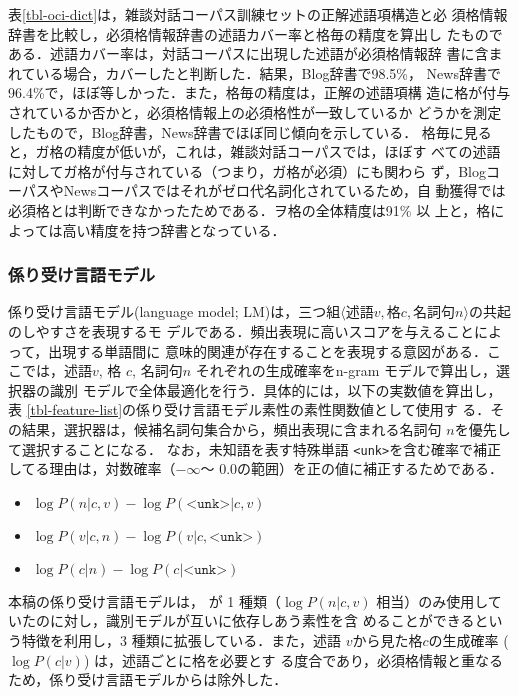 \documentclass[japanese]{jnlp_1.4}
\begin{document}
表\ref{tbl-oci-dict}は，雑談対話コーパス訓練セットの正解述語項構造と必
須格情報辞書を比較し，必須格情報辞書の述語カバー率と格毎の精度を算出し
たものである．述語カバー率は，対話コーパスに出現した述語が必須格情報辞
書に含まれている場合，カバーしたと判断した．結果，Blog辞書で98.5\%，
News辞書で96.4\%で，ほぼ等しかった．また，格毎の精度は，正解の述語項構
造に格が付与されているか否かと，必須格情報上の必須格性が一致しているか
どうかを測定したもので，Blog辞書，News辞書でほぼ同じ傾向を示している．
格毎に見ると，ガ格の精度が低いが，これは，雑談対話コーパスでは，ほぼす
べての述語に対してガ格が付与されている（つまり，ガ格が必須）にも関わら
ず，BlogコーパスやNewsコーパスではそれがゼロ代名詞化されているため，自
動獲得では必須格とは判断できなかったためである．ヲ格の全体精度は91\% 以
上と，格によっては高い精度を持つ辞書となっている．



\subsubsection{係り受け言語モデル}
\label{sec-dependency-lm}

係り受け言語モデル(language model; LM)は，三つ組$\langle \text{述語}
v, \text{格}c, \text{名詞句}n \rangle$の共起のしやすさを表現するモ
デルである．頻出表現に高いスコアを与えることによって，出現する単語間に
意味的関連が存在することを表現する意図がある．ここでは，述語$v$, 格
$c$, 名詞句$n$ それぞれの生成確率をn-gram モデルで算出し，選択器の識別
モデルで全体最適化を行う．具体的には，以下の実数値を算出し，表
\ref{tbl-feature-list}の係り受け言語モデル素性の素性関数値として使用す
る．その結果，選択器は，候補名詞句集合から，頻出表現に含まれる名詞句
$n$を優先して選択することになる． なお，未知語を表す特殊単語
\texttt{<unk>}を含む確率で補正してる理由は，対数確率（{$-\infty$〜
$0.0$}の範囲）を正の値に補正するためである．

\begin{itemize}
\item $\log P(n | c, v) - \log P(\texttt{<unk>} | c, v)$
\item $\log P(v | c, n) - \log P(v | c, \texttt{<unk>})$
\item $\log P(c | n) - \log P(c | \texttt{<unk>})$
\end{itemize}

本稿の係り受け言語モデルは，
が 1 種類（{$\log P(n|c,v)$}
  相当）のみ使用していたのに対し，識別モデルが互いに依存しあう素性を含
めることができるという特徴を利用し，3 種類に拡張している．また，述語
$v$から見た格$c$の生成確率 ({$\log P(c|v)$}) は，述語ごとに格を必要とす
る度合であり，必須格情報と重なるため，係り受け言語モデルからは除外した．
\end{document}
